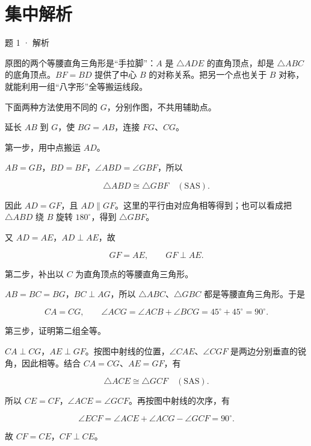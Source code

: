 \section{集中解析}
\begin{solution}{题 1 · 解析}
\think

原图的两个等腰直角三角形是“手拉脚”：\(A\) 是 \(\triangle ADE\) 的直角顶点，却是 \(\triangle ABC\) 的底角顶点。\(BF=BD\) 提供了中心 \(B\) 的对称关系。把另一个点也关于 \(B\) 对称，就能利用一组“八字形”全等搬运线段。

下面两种方法使用不同的 \(G\)，分别作图，不共用辅助点。


\diagram{\hhOneExtend}

\solve

延长 \(AB\) 到 \(G\)，使 \(BG=AB\)，连接 \(FG\)、\(CG\)。

第一步，用中点搬运 \(AD\)。

\(AB=GB\)，\(BD=BF\)，\(\angle ABD=\angle GBF\)，所以

\[
\triangle ABD\cong\triangle GBF\quad(\mathrm{SAS}).
\]

因此 \(AD=GF\)，且 \(AD\parallel GF\)。这里的平行由对应角相等得到；也可以看成把 \(\triangle ABD\) 绕 \(B\) 旋转 \(180^\circ\)，得到 \(\triangle GBF\)。

又 \(AD=AE\)，\(AD\perp AE\)，故

\[
GF=AE,\qquad GF\perp AE.
\]

第二步，补出以 \(C\) 为直角顶点的等腰直角三角形。

\(AB=BC=BG\)，\(BC\perp AG\)，所以 \(\triangle ABC\)、\(\triangle GBC\) 都是等腰直角三角形。于是

\[
CA=CG,\qquad
\angle ACG=\angle ACB+\angle BCG=45^\circ+45^\circ=90^\circ.
\]

第三步，证明第二组全等。

\(CA\perp CG\)，\(AE\perp GF\)。按图中射线的位置，\(\angle CAE\)、\(\angle CGF\) 是两边分别垂直的锐角，因此相等。结合 \(CA=CG\)、\(AE=GF\)，有

\[
\triangle ACE\cong\triangle GCF\quad(\mathrm{SAS}).
\]

所以 \(CE=CF\)，\(\angle ACE=\angle GCF\)。再按图中射线的次序，有

\[
\angle ECF
=\angle ACE+\angle ACG-\angle GCF
=90^\circ.
\]

故 \(CF=CE\)，\(CF\perp CE\)。



\end{solution}
